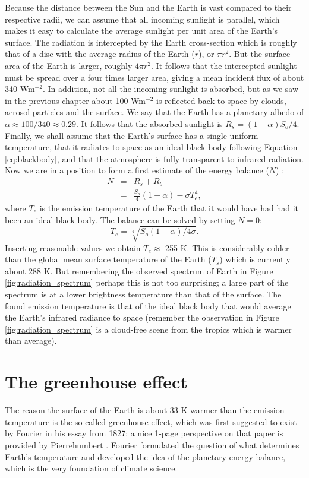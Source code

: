 \documentclass[12pt]{book}
\begin{document}
Because the distance between the Sun and the Earth is vast compared to their respective radii, we can assume that all incoming sunlight is parallel, which makes it easy to calculate the average sunlight per unit area of the Earth's surface. The radiation is intercepted by the Earth cross-section which is roughly that of a disc with the average radius of the Earth ($r$), or $\pi r^2$. But the surface area of the Earth is larger, roughly $4\pi r^2$. It follows that the intercepted sunlight must be spread over a four times larger area, giving a mean incident flux of about 340 Wm$^{-2}$. In addition, not all the incoming sunlight is absorbed, but as we saw in the previous chapter about 100 Wm$^{-2}$ is reflected back to space by clouds, aerosol particles and the surface. We say that the Earth has a planetary albedo of $\alpha \approx 100/340 \approx 0.29$. It follows that the absorbed sunlight is $R_s=(1-\alpha)S_o/4$. Finally, we shall assume that the Earth's surface has a single uniform temperature, that it radiates to space as an ideal black body following Equation \ref{eq:blackbody}, and that the atmosphere is fully transparent to infrared radiation.
Now we are in a position to form a first estimate of the energy balance ($N$) :
\begin{eqnarray}
N &=& R_s + R_b \nonumber \\ 
   &=& \frac{S_o}{4}(1-\alpha) - \sigma T_e^4,
\label{eq:black_body_energy_balance}
\end{eqnarray}
\noindent where $T_e$ is the emission temperature of the Earth that it would have had had it been an ideal black body. The balance  can be solved by setting $N=0$:
\begin{equation}
T_e = \sqrt[4]{S_o(1-\alpha)/4\sigma}. 
\end{equation}
Inserting reasonable values we obtain $T_e \approx$  255 K. This is considerably colder than the global mean surface temperature of the Earth ($T_s$) which is currently about 288 K. But remembering the observed spectrum of Earth in Figure \ref{fig:radiation_spectrum} perhaps this is not too surprising; a large part of the spectrum is at a lower brightness temperature than that of the surface. The found emission temperature is that of the ideal black body that would average the Earth's infrared radiance to space (remember the observation in Figure \ref{fig:radiation_spectrum} is a cloud-free scene from the tropics which is warmer than average).

\section{The greenhouse effect}
The reason the surface of the Earth is about 33 K warmer than the emission temperature is the so-called greenhouse effect, which was first suggested to exist by Fourier in his essay from 1827; a nice 1-page perspective on that paper is provided by Pierrehumbert \cite{Pierrehumbert2004}. Fourier formulated the question of what determines Earth's temperature and developed the idea of the planetary energy balance, which is the very foundation of climate science. 
\end{document}
